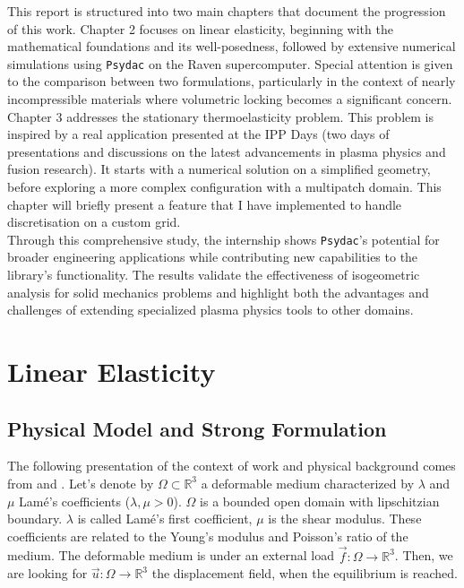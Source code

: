 \documentclass[a4paper,12pt,twoside]{report}
\newcommand{\mtr}{\mathbb{R}}
\begin{document}
This report is structured into two main chapters that document the progression of this work. Chapter 2 focuses on linear elasticity, beginning with the mathematical foundations and its well-posedness, followed by extensive numerical simulations using \texttt{Psydac} on the Raven supercomputer. Special attention is given to the comparison between two formulations, particularly in the context of nearly incompressible materials where volumetric locking becomes a significant concern. Chapter 3 addresses the stationary thermoelasticity problem. This problem is inspired by a real application presented at the IPP Days (two days of presentations and discussions on the latest advancements in plasma physics and fusion research). It starts with a numerical solution on a simplified geometry, before exploring a more complex configuration with a multipatch domain. This chapter will briefly present a feature that I have implemented to handle discretisation on a custom grid.\\

Through this comprehensive study, the internship shows \texttt{Psydac}'s potential for broader engineering applications while contributing new capabilities to the library's functionality. The results validate the effectiveness of isogeometric analysis for solid mechanics problems and highlight both the advantages and challenges of extending specialized plasma physics tools to other domains.

\chapter{Linear Elasticity}
\label{chap:linear_elasticity}

\section{Physical Model and Strong Formulation}
The following presentation of the context of work and physical background comes from \cite{gould_introduction_2013} and \cite{ern_theory_2004}.
Let's denote by $\Omega \subset \mtr^3$ a deformable medium characterized by $\lambda$ and $\mu$ Lamé's coefficients ($\lambda, \mu > 0$). $\Omega$ is a bounded open domain with lipschitzian boundary. $\lambda$ is called Lamé's first coefficient, $\mu$ is the shear modulus. These coefficients are related to the Young's modulus and Poisson's ratio of the medium. The deformable medium is under an external load $\vec f : \Omega \rightarrow \mtr^3$. Then, we are looking for $\vec u : \Omega \rightarrow \mtr^3$ the displacement field, when the equilibrium is reached. 
\end{document}
